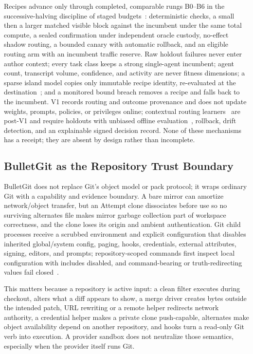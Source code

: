 \documentclass[journal]{IEEEtran}
\newcommand{\code}[1]{\texttt{\detokenize{#1}}}
\begin{document}
Recipes advance only through completed, comparable rungs B0--B6 in the
successive-halving discipline of staged budgets~\cite{jamieson2016,li2020asha}:
deterministic checks, a small then a larger matched visible block against the
incumbent under the same total compute, a sealed confirmation under
independent oracle custody, no-effect shadow routing, a bounded canary with
automatic rollback, and an eligible routing arm with an incumbent traffic
reserve. Raw holdout failures never enter author context; every task class
keeps a strong single-agent incumbent; agent count, transcript volume,
confidence, and activity are never fitness dimensions; a sparse island model
copies only immutable recipe identity, re-evaluated at the
destination~\cite{alba2002}; and a monitored bound breach removes a recipe and
falls back to the incumbent. V1 records routing and outcome provenance and
does not update weights, prompts, policies, or privileges online; contextual
routing learners~\cite{li2010} are post-V1 and require holdouts with unbiased
offline evaluation~\cite{li2011}, rollback, drift detection, and an
explainable signed decision record. None of these mechanisms has a receipt;
they are absent by design rather than incomplete.

\subsection{BulletGit as the Repository Trust Boundary}

BulletGit does not replace Git's object model or pack protocol; it wraps
ordinary Git with a capability and evidence boundary. A bare mirror can
amortize network/object transfer, but an Attempt clone dissociates before use
so no surviving alternates file makes mirror garbage collection part of
workspace correctness, and the clone loses its origin and ambient
authentication. Git child processes receive a scrubbed environment and
explicit configuration that disables inherited global/system config, paging,
hooks, credentials, external attributes, signing, editors, and prompts;
repository-scoped commands first inspect local configuration with includes
disabled, and command-bearing or truth-redirecting values fail
closed~\cite{bulletGitArch}.

This matters because a repository is active input: a clean filter executes
during checkout, \code{textconv} alters what a diff appears to show, a merge
driver creates bytes outside the intended patch, URL rewriting or a remote
helper redirects network authority, a credential helper makes a private clone
push-capable, alternates make object availability depend on another
repository, and hooks turn a read-only Git verb into execution. A provider
sandbox does not neutralize those semantics, especially when the provider
itself runs Git.
\end{document}
